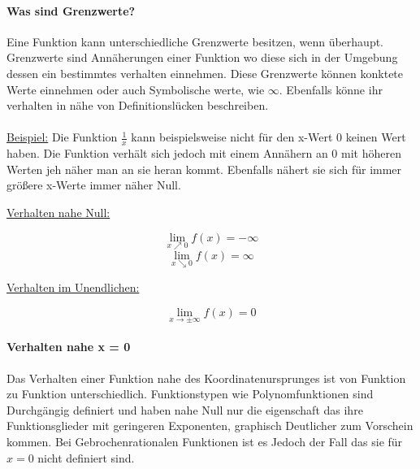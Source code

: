 \documentclass{article}
\begin{document}
		\paragraph{Was sind Grenzwerte?} \label{Definitionsbereich}
			Eine Funktion kann unterschiedliche Grenzwerte besitzen, wenn überhaupt. Grenzwerte sind Annäherungen einer Funktion wo diese sich in der Umgebung dessen ein bestimmtes verhalten einnehmen. Diese Grenzwerte können konktete Werte einnehmen oder auch Symbolische werte, wie $\infty$. Ebenfalls könne ihr verhalten in nähe von Definitionslücken beschreiben.\\ \\
			\underline{Beispiel:} Die Funktion $ \frac {1} {x}$ kann beispielsweise nicht für den x-Wert $0$ keinen Wert haben. Die Funktion verhält sich jedoch mit einem Annähern an $0$ mit höheren Werten jeh näher man an sie heran kommt. Ebenfalls nähert sie sich für immer größere x-Werte immer näher Null.
			
			\begin{multicols}{2}
			
		
				\underline{Verhalten nahe Null:}
				
				\[\lim\limits_{x \nearrow 0} f(x) = - \infty\]
				\[\lim\limits_{x \searrow 0} f(x) =  \infty\]
				
				\underline{Verhalten im Unendlichen:}
				
				\[\lim\limits_{x \rightarrow \pm \infty} f(x) = 0\]
			
			\end{multicols}
				
		\paragraph{Verhalten nahe x = 0 \\}\label{Verhalten nahe Null}
			Das Verhalten einer Funktion nahe des Koordinatenursprunges ist von Funktion zu Funktion unterschiedlich. Funktionstypen wie Polynomfunktionen sind Durchgängig definiert und haben nahe Null nur die eigenschaft das ihre Funktionsglieder mit geringeren Exponenten, graphisch Deutlicher zum Vorschein kommen. Bei Gebrochenrationalen Funktionen ist es Jedoch der Fall das sie für $x = 0$ nicht definiert sind.\\
			
\end{document}
